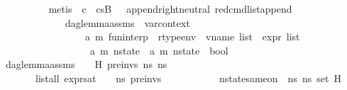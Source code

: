 \begin{isabellebody}
\ \ \ \ \ \ \ \ \ \ \isamarkupfalse%
\ {\isacharparenleft}{\kern0pt}metis\ {\isacartoucheopen}{\isasymnot}\ c\ {\isasymLongrightarrow}\ cs{}B{\isacharprime}{\kern0pt}{\isacharprime}{\kern0pt}{\isacharprime}{\kern0pt}\ {\isacharequal}{\kern0pt}\ {\isacharbrackleft}{\kern0pt}{\isacharbrackright}{\kern0pt}{\isacartoucheclose}\ append{\isachardot}{\kern0pt}right{\isacharunderscore}{\kern0pt}neutral\ red{\isacharunderscore}{\kern0pt}cmd{\isacharunderscore}{\kern0pt}list{\isacharunderscore}{\kern0pt}append{\isacharparenright}{\kern0pt}\isanewline
\ \ \ \ \ \ \ \ \isamarkupfalse%
\isanewline
\ \ \ \ \ \ \isamarkupfalse%
\isanewline
\ \ \ \ \isamarkupfalse%
\isanewline
\ \ \isamarkupfalse%
%
\endisatagproof
{\isafoldproof}%
%
\isadelimproof
\isanewline
%
\endisadelimproof
\isanewline
{}\isamarkupfalse%
\ dag{\isacharunderscore}{\kern0pt}lemma{\isacharunderscore}{\kern0pt}assms\ {\isacharcolon}{\kern0pt}{\isacharcolon}{\kern0pt}\ {\isachardoublequoteopen}var{\isacharunderscore}{\kern0pt}context\ {\isasymRightarrow}\isanewline
\ \ \ \ \ \ \ \ \ \ \ \ \ \ \ \ \ \ \ {\isacharparenleft}{\kern0pt}{\isacharprime}{\kern0pt}a{\isacharcomma}{\kern0pt}\ {\isacharprime}{\kern0pt}m{\isacharparenright}{\kern0pt}\ fun{\isacharunderscore}{\kern0pt}interp\ {\isasymRightarrow}\ rtype{\isacharunderscore}{\kern0pt}env\ {\isasymRightarrow}\ vname\ list\ {\isasymRightarrow}\ expr\ list\ {\isasymRightarrow}\ \isanewline
\ \ \ \ \ \ \ \ \ \ \ \ \ \ \ \ \ \ \ \ {\isacharparenleft}{\kern0pt}{\isacharprime}{\kern0pt}a{\isacharcomma}{\kern0pt}\ {\isacharprime}{\kern0pt}m{\isacharparenright}{\kern0pt}\ nstate\ {\isasymRightarrow}\ {\isacharparenleft}{\kern0pt}{\isacharprime}{\kern0pt}a{\isacharcomma}{\kern0pt}\ {\isacharprime}{\kern0pt}m{\isacharparenright}{\kern0pt}\ nstate\ {\isasymRightarrow}\ bool{\isachardoublequoteclose}\isanewline
\ \ \ {\isachardoublequoteopen}dag{\isacharunderscore}{\kern0pt}lemma{\isacharunderscore}{\kern0pt}assms\ {\isasymLambda}\ {\isasymGamma}\ {\isasymOmega}\ H\ pre{\isacharunderscore}{\kern0pt}invs\ ns{}\ ns{}\ {\isasymequiv}\ \isanewline
\ \ \ \ \ \ \ \ \ {\isacharparenleft}{\kern0pt}list{\isacharunderscore}{\kern0pt}all\ {\isacharparenleft}{\kern0pt}expr{\isacharunderscore}{\kern0pt}sat\ {\isasymLambda}\ {\isasymGamma}\ {\isasymOmega}\ ns{}{\isacharparenright}{\kern0pt}\ pre{\isacharunderscore}{\kern0pt}invs{\isacharparenright}{\kern0pt}\ {\isasymand}\isanewline
\ \ \ \ \ \ \ \ \ \ {\isacharparenleft}{\kern0pt}nstate{\isacharunderscore}{\kern0pt}same{\isacharunderscore}{\kern0pt}on\ {\isasymLambda}\ ns{}\ ns{}\ {\isacharparenleft}{\kern0pt}set\ H{\isacharparenright}{\kern0pt}{\isacharparenright}{\kern0pt}\ {\isasymand}\isanewline

\end{isabellebody}
